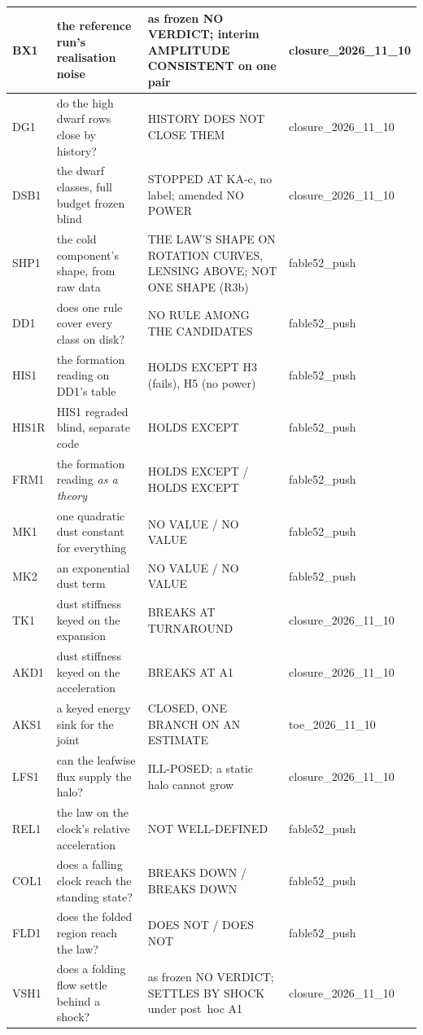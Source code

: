 \documentclass[10pt]{article}
\begin{document}
\begin{center}
\begin{longtable}{@{}p{1.3cm}p{5.0cm}p{5.4cm}p{2.4cm}@{}}
BX1 & the reference run's realisation noise & as frozen NO VERDICT; interim AMPLITUDE CONSISTENT on one pair & closure\_2026\_11\_10\\\midrule
DG1 & do the high dwarf rows close by history? & HISTORY DOES NOT CLOSE THEM & closure\_2026\_11\_10\\\midrule
DSB1 & the dwarf classes, full budget frozen blind & STOPPED AT KA-c, no label; amended NO POWER & closure\_2026\_11\_10\\\midrule
SHP1 & the cold component's shape, from raw data & THE LAW'S SHAPE ON ROTATION CURVES, LENSING ABOVE; NOT ONE SHAPE (R3b) & fable52\_push\\\midrule
DD1 & does one rule cover every class on disk? & NO RULE AMONG THE CANDIDATES & fable52\_push\\\midrule
HIS1 & the formation reading on DD1's table & HOLDS EXCEPT H3 (fails), H5 (no power) & fable52\_push\\\midrule
HIS1R & HIS1 regraded blind, separate code & HOLDS EXCEPT & fable52\_push\\\midrule
FRM1 & the formation reading {\it as a theory} & HOLDS EXCEPT / HOLDS EXCEPT & fable52\_push\\\midrule
MK1 & one quadratic dust constant for everything & NO VALUE / NO VALUE & fable52\_push\\\midrule
MK2 & an exponential dust term & NO VALUE / NO VALUE & fable52\_push\\\midrule
TK1 & dust stiffness keyed on the expansion & BREAKS AT TURNAROUND & closure\_2026\_11\_10\\\midrule
AKD1 & dust stiffness keyed on the acceleration & BREAKS AT A1 & closure\_2026\_11\_10\\\midrule
AKS1 & a keyed energy sink for the joint & CLOSED, ONE BRANCH ON AN ESTIMATE & toe\_2026\_11\_10\\\midrule
LFS1 & can the leafwise flux supply the halo? & ILL-POSED; a static halo cannot grow & closure\_2026\_11\_10\\\midrule
REL1 & the law on the clock's relative acceleration & NOT WELL-DEFINED & fable52\_push\\\midrule
COL1 & does a falling clock reach the standing state? & BREAKS DOWN / BREAKS DOWN & fable52\_push\\\midrule
FLD1 & does the folded region reach the law? & DOES NOT / DOES NOT & fable52\_push\\\midrule
VSH1 & does a folding flow settle behind a shock? & as frozen NO VERDICT; SETTLES BY SHOCK under post~hoc A1 & closure\_2026\_11\_10\\\midrule

\end{longtable}
\end{center}
\end{document}
